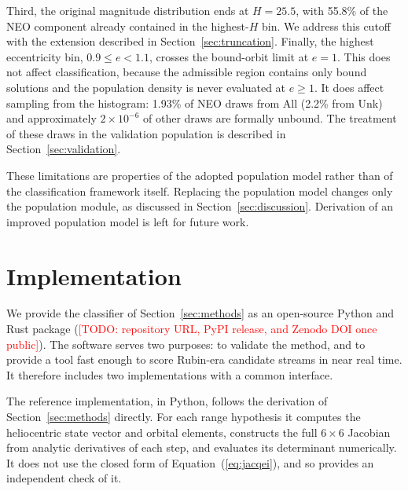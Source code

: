 \documentclass[linenumbers,twocolumn]{aastex701}
\newcommand{\todo}[1]{\textcolor{red}{[TODO: #1]}}
\begin{document}
Third, the original magnitude distribution ends at $H=25.5$, with 55.8\% of
the NEO component already contained in the highest-$H$ bin. We address this
cutoff with the extension described in
Section~\ref{sec:truncation}. Finally, the highest eccentricity bin,
$0.9\le e<1.1$, crosses the bound-orbit limit at $e=1$. This does not affect
classification, because the admissible region contains only bound solutions
and the population density is never evaluated at $e\ge1$. It does affect
sampling from the histogram: 1.93\% of NEO draws from All (2.2\% from Unk) and approximately
$2\times10^{-6}$ of other draws are formally unbound. The treatment of these
draws in the validation population is described in
Section~\ref{sec:validation}.

These limitations are properties of the adopted population model rather than of
the classification framework itself. Replacing the population model changes
only the population module, as discussed in Section~\ref{sec:discussion}.
Derivation of an improved population model is left for future work.


\section{Implementation}
\label{sec:implementation}

We provide the classifier of Section~\ref{sec:methods} as an open-source
Python and Rust package
(\todo{repository URL, PyPI release, and Zenodo DOI once public}). The
software serves two purposes: to validate the method, and to provide a tool
fast enough to score Rubin-era candidate streams in near real time. It
therefore includes two implementations with a common interface.

The reference implementation, in Python, follows the derivation of
Section~\ref{sec:methods} directly. For each range hypothesis it computes
the heliocentric state vector and orbital elements, constructs the full
$6\times6$ Jacobian from analytic derivatives of each step, and evaluates
its determinant numerically. It does not use the closed form of
Equation~(\ref{eq:jacqei}), and so provides an independent check of it.
\end{document}
